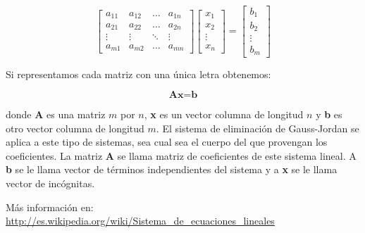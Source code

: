 \documentclass[12pt,letterpaper]{article}
\begin{document}
\begin{equation}
  \begin{bmatrix}
    a_{11} & a_{12}  & \dots & a_{1n} \\
	a_{21} & a_{22} & \dots & a_{2n} \\
	\vdots  & \vdots & \ddots & \vdots  \\
	a_{m1} & a_{m2}  & \dots & a_{mn} 
  \end{bmatrix}
  \begin{bmatrix}
	x_1 \\ x_2 \\ \vdots \\ x_n 
  \end{bmatrix}
  =
  \begin{bmatrix}
	b_1 \\ b_2 \\ \vdots \\ b_m
  \end{bmatrix}
\end{equation}

Si representamos cada matriz con una única letra obtenemos:

\[
  \mathrm{\textbf{Ax}}=\mathrm{\textbf{b}}
\]

\noindent donde \textbf{A} es una matriz $m$ por $n$, \textbf{x} es un vector columna de longitud $n$ y \textbf{b} es otro vector columna de longitud $m$. El sistema de eliminación de Gauss-Jordan se aplica a este tipo de sistemas, sea cual sea el cuerpo del que provengan los coeficientes. La matriz \textbf{A} se llama matriz de coeficientes de este sistema lineal. A \textbf{b} se le llama vector de términos independientes del sistema y a \textbf{x} se le llama vector de incógnitas.

Más información en: \url{http://es.wikipedia.org/wiki/Sistema_de_ecuaciones_lineales}
\end{document}
